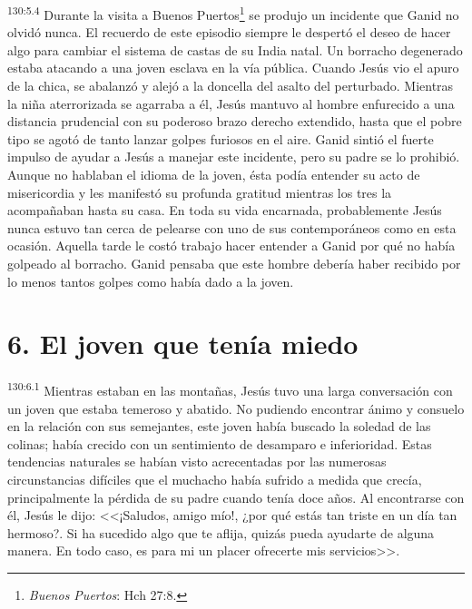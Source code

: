 \par 
\textsuperscript{130:5.4} Durante la visita a Buenos Puertos\footnote{\textit{Buenos Puertos}: Hch 27:8.} se produjo un incidente que Ganid no olvidó nunca. El recuerdo de este episodio siempre le despertó el deseo de hacer algo para cambiar el sistema de castas de su India natal. Un borracho degenerado estaba atacando a una joven esclava en la vía pública. Cuando Jesús vio el apuro de la chica, se abalanzó y alejó a la doncella del asalto del perturbado. Mientras la niña aterrorizada se agarraba a él, Jesús mantuvo al hombre enfurecido a una distancia prudencial con su poderoso brazo derecho extendido, hasta que el pobre tipo se agotó de tanto lanzar golpes furiosos en el aire. Ganid sintió el fuerte impulso de ayudar a Jesús a manejar este incidente, pero su padre se lo prohibió. Aunque no hablaban el idioma de la joven, ésta podía entender su acto de misericordia y les manifestó su profunda gratitud mientras los tres la acompañaban hasta su casa. En toda su vida encarnada, probablemente Jesús nunca estuvo tan cerca de pelearse con uno de sus contemporáneos como en esta ocasión. Aquella tarde le costó trabajo hacer entender a Ganid por qué no había golpeado al borracho. Ganid pensaba que este hombre debería haber recibido por lo menos tantos golpes como había dado a la joven.

\section*{6. El joven que tenía miedo}
\par 
\textsuperscript{130:6.1} Mientras estaban en las montañas, Jesús tuvo una larga conversación con un joven que estaba temeroso y abatido. No pudiendo encontrar ánimo y consuelo en la relación con sus semejantes, este joven había buscado la soledad de las colinas; había crecido con un sentimiento de desamparo e inferioridad. Estas tendencias naturales se habían visto acrecentadas por las numerosas circunstancias difíciles que el muchacho había sufrido a medida que crecía, principalmente la pérdida de su padre cuando tenía doce años. Al encontrarse con él, Jesús le dijo: <<¡Saludos, amigo mío!, ¿por qué estás tan triste en un día tan hermoso?. Si ha sucedido algo que te aflija, quizás pueda ayudarte de alguna manera. En todo caso, es para mi un placer ofrecerte mis servicios>>.


